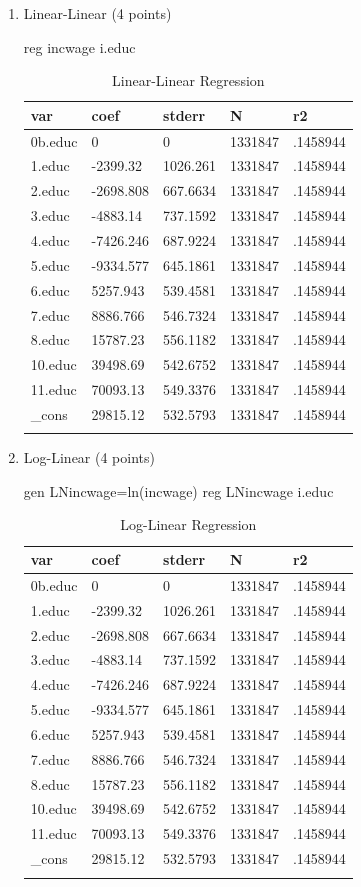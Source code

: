 \documentclass{article}
\begin{document}
\begin{enumerate}[label=\alph*]

\item Linear-Linear (4 points)

reg incwage i.educ

\begin{table}[tbp] \centering
	
	\caption{Linear-Linear Regression}
	\begin{tabularx}{\textwidth}{lCCCC}
		
		\toprule
		{var}&{coef}&{stderr}&{N}&{r2} \tabularnewline
		\midrule\addlinespace[1.5ex]
		0b.educ&0&0&1331847&.1458944 \tabularnewline
		1.educ&-2399.32&1026.261&1331847&.1458944 \tabularnewline
		2.educ&-2698.808&667.6634&1331847&.1458944 \tabularnewline
		3.educ&-4883.14&737.1592&1331847&.1458944 \tabularnewline
		4.educ&-7426.246&687.9224&1331847&.1458944 \tabularnewline
		5.educ&-9334.577&645.1861&1331847&.1458944 \tabularnewline
		6.educ&5257.943&539.4581&1331847&.1458944 \tabularnewline
		7.educ&8886.766&546.7324&1331847&.1458944 \tabularnewline
		8.educ&15787.23&556.1182&1331847&.1458944 \tabularnewline
		10.educ&39498.69&542.6752&1331847&.1458944 \tabularnewline
		11.educ&70093.13&549.3376&1331847&.1458944 \tabularnewline
		\_cons&29815.12&532.5793&1331847&.1458944 \tabularnewline
		\bottomrule \addlinespace[1.5ex]
		
	\end{tabularx}
\end{table}



\item Log-Linear (4 points)

gen LNincwage=ln(incwage)
reg LNincwage i.educ


\begin{table}[tbp] \centering
	
	\caption{Log-Linear Regression}
	\begin{tabularx}{\textwidth}{lCCCC}
		
		\toprule
		{var}&{coef}&{stderr}&{N}&{r2} \tabularnewline
		\midrule\addlinespace[1.5ex]
		0b.educ&0&0&1331847&.1458944 \tabularnewline
		1.educ&-2399.32&1026.261&1331847&.1458944 \tabularnewline
		2.educ&-2698.808&667.6634&1331847&.1458944 \tabularnewline
		3.educ&-4883.14&737.1592&1331847&.1458944 \tabularnewline
		4.educ&-7426.246&687.9224&1331847&.1458944 \tabularnewline
		5.educ&-9334.577&645.1861&1331847&.1458944 \tabularnewline
		6.educ&5257.943&539.4581&1331847&.1458944 \tabularnewline
		7.educ&8886.766&546.7324&1331847&.1458944 \tabularnewline
		8.educ&15787.23&556.1182&1331847&.1458944 \tabularnewline
		10.educ&39498.69&542.6752&1331847&.1458944 \tabularnewline
		11.educ&70093.13&549.3376&1331847&.1458944 \tabularnewline
		\_cons&29815.12&532.5793&1331847&.1458944 \tabularnewline
		\bottomrule \addlinespace[1.5ex]
		

\end{tabularx}
\end{table}
\end{enumerate}
\end{document}
